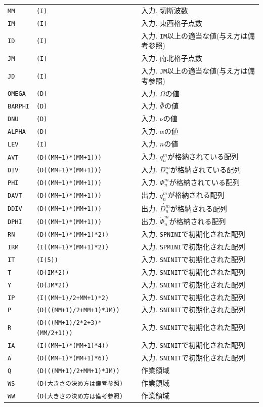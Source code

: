 \documentclass[a4j,fleqn]{jarticle}
\begin{document}
\begin{enumerate}
\begin{tabular}{lll}
{\tt MM} & {\tt (I)} & 入力. 切断波数\\
{\tt IM} & {\tt (I)} & 入力. 東西格子点数\\
{\tt ID} & {\tt (I)} & 入力. {\tt IM}以上の適当な値(与え方は備考参照)\\
{\tt JM} & {\tt (I)} & 入力. 南北格子点数\\
{\tt JD} & {\tt (I)} & 入力. {\tt JM}以上の適当な値(与え方は備考参照)\\
{\tt OMEGA} & {\tt (D)} 
& 入力. $\Omega$の値\\
{\tt BARPHI} & {\tt (D)} 
& 入力. $\bar\Phi$の値\\
{\tt DNU} & {\tt (D)} 
& 入力. $\nu$の値\\
{\tt ALPHA} & {\tt (D)} 
& 入力. $\alpha$の値\\
{\tt LEV} & {\tt (I)}
& 入力. $n$の値\\
{\tt AVT} & {\tt (D((MM+1)*(MM+1)))} 
& 入力. $q^m_n$が格納されている配列\\
{\tt DIV} & {\tt (D((MM+1)*(MM+1)))} 
& 入力. $D^m_n$が格納されている配列\\
{\tt PHI} & {\tt (D((MM+1)*(MM+1)))} 
& 入力. $\Phi^m_n$が格納されている配列\\
{\tt DAVT} & {\tt (D((MM+1)*(MM+1)))} 
& 出力. $\dot{q^m_n}$が格納される配列\\
{\tt DDIV} & {\tt (D((MM+1)*(MM+1)))} 
& 出力. $\dot{D^m_n}$が格納される配列\\
{\tt DPHI} & {\tt (D((MM+1)*(MM+1)))} 
& 出力. $\dot{\Phi}^m_n$が格納される配列\\
{\tt RN} & {\tt (D((MM+1)*(MM+1)*2))} 
& 入力. {\tt SPNINI}で初期化された配列\\
{\tt IRM} & {\tt (I((MM+1)*(MM+1)*2))} 
& 入力. {\tt SPMINI}で初期化された配列\\
{\tt IT}  & {\tt (I(5))}    & 入力. {\tt SNINIT}で初期化された配列\\
{\tt T}   & {\tt (D(IM*2))} & 入力. {\tt SNINIT}で初期化された配列\\
{\tt Y}   & {\tt (D(JM*2))} & 入力. {\tt SNINIT}で初期化された配列\\
{\tt IP}  & {\tt (I((MM+1)/2+MM+1)*2)} 
             & 入力. {\tt SNINIT}で初期化された配列\\
{\tt P}  & {\tt (D(((MM+1)/2+MM+1)*JM))} 
             & 入力. {\tt SNINIT}で初期化された配列\\
{\tt R}  & {\tt (D(((MM+1)/2*2+3)*(MM/2+1)))} 
             & 入力. {\tt SNINIT}で初期化された配列\\
{\tt IA}  & {\tt (I((MM+1)*(MM+1)*4))}
             & 入力. {\tt SNINIT}で初期化された配列\\
{\tt A}  & {\tt (D((MM+1)*(MM+1)*6))}
             & 入力. {\tt SNINIT}で初期化された配列\\
{\tt Q}  & {\tt (D(((MM+1)/2+MM+1)*JM))} 
             & 作業領域\\
{\tt WS}  & {\tt (D(大きさの決め方は備考参照)} & 作業領域\\
{\tt WW}  & {\tt (D(大きさの決め方は備考参照)} & 作業領域
\end{tabular}


\end{enumerate}
\end{document}
